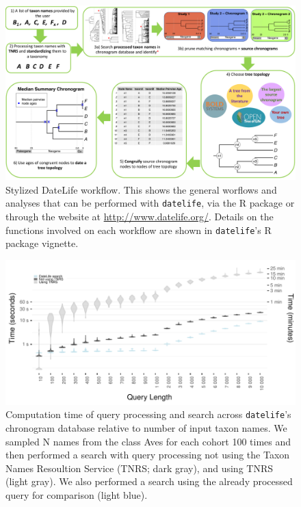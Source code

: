 

\begin{figure}[!h]
\includegraphics{../figures/figure1/figure1-new.pdf}
\caption{Stylized DateLife workflow. This shows the general worflows and analyses that can be performed with \texttt{datelife}, via the R package or through the website  at \url{http://www.datelife.org/}. Details on the functions involved on each workflow are shown in \texttt{datelife}'s R package vignette.
}
\label{fig:workflow}
\end{figure}

\begin{figure}[!h]
\includegraphics[width=1\linewidth]{../figures/fig_runtime_main.pdf}
\caption{Computation time of query processing and search across \texttt{datelife}'s chronogram database relative to number of input taxon names. We sampled N names from the class Aves for each cohort 100 times and then performed a search with query processing not using the Taxon Names Resoultion Service (TNRS; dark gray), and using TNRS (light gray). We also performed a search using the already processed query for comparison (light blue).}
\label{fig:runtime_main}
\end{figure}

